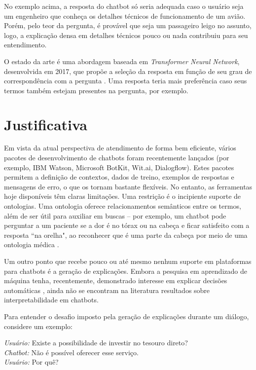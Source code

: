 \documentclass[]{politex}
\begin{document}
No exemplo acima, a resposta do chatbot só seria adequada caso o usuário seja um engenheiro que conheça os detalhes técnicos de funcionamento de um avião. Porém, pelo teor da pergunta, é provável que seja um passageiro leigo no assunto, logo, a explicação densa em detalhes técnicos pouco ou nada contribuiu para seu entendimento.

O estado da arte é uma abordagem baseada em \textit{Transformer Neural Network}, desenvolvida em 2017, que propõe a seleção da resposta em função de seu grau de correspondência com a pergunta \cite{P18-1103}. Uma resposta teria mais preferência caso seus termos também estejam presentes na pergunta, por exemplo.

\section{Justificativa}

Em vista da atual perspectiva de atendimento de forma bem eficiente, vários pacotes de desenvolvimento de chatbots foram recentemente lançados (por exemplo, IBM Watson, Microsoft BotKit, Wit.ai, Dialogflow). Estes pacotes permitem a definição de contextos, dados de treino, exemplos de respostas e mensagens de erro, o que os tornam bastante flexíveis. No entanto, as ferramentas hoje disponíveis têm claras limitações. Uma restrição é o incipiente suporte de ontologias. Uma ontologia oferece relacionamentos semânticos entre os termos, além de ser útil para auxiliar em buscas -- por exemplo, um chatbot pode perguntar a um paciente se a dor é no tórax ou na cabeça e ficar satisfeito com a resposta ``na orelha", ao reconhecer que é uma parte da cabeça por meio de uma ontologia médica \cite{MilwardBeveridge03KRPDS}.

Um outro ponto que recebe pouco ou até mesmo nenhum suporte em plataformas para chatbots é a geração de explicações. Embora a pesquisa em aprendizado de máquina tenha, recentemente, demonstrado interesse em explicar decisões automáticas \cite{Ribeiro:2016:WIT:2939672.2939778}, ainda não se encontram na literatura resultados sobre interpretabilidade em chatbots. 

Para entender o desafio imposto pela geração de explicações durante um diálogo, considere um exemplo:

\begin{flushleft}
    \textit{Usuário:} Existe a possibilidade de investir no tesouro direto? \\
    \textit{Chatbot:} Não é possível oferecer esse serviço. \\
    \textit{Usuário:} Por quê?
\end{flushleft}
\end{document}

